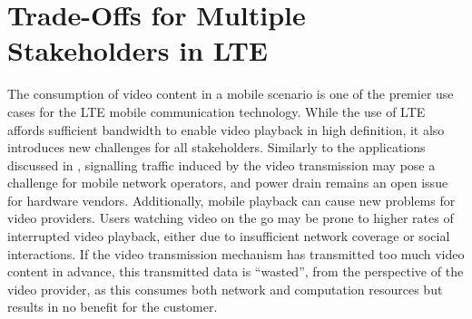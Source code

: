 \section{Trade-Offs for Multiple Stakeholders in LTE}\label{sec:application:lte_video}

\newcommand{\bandwidth}{\ensuremath{b_W}\xspace}
\newcommand{\bitrate}{\ensuremath{b_R}\xspace}
\newcommand{\timeplayedback}{\ensuremath{t_p}}

\newcommand{\streamingstart}{\ensuremath{\sigma}\xspace}
\newcommand{\bufferlower}{\ensuremath{\theta}\xspace}
\newcommand{\buffersize}{\ensuremath{\Theta}\xspace}

\newcommand{\ton}{\(T_{\texttt{ON}}\)\xspace}
\newcommand{\tdrxinactivity}{\(T_{\texttt{I}}\)\xspace}

\newcommand{\shortdrx}{\texttt{Short} \texttt{DRX}\xspace}
\newcommand{\tshortdrx}{\(T_{\texttt{S}}\)\xspace}
\newcommand{\longdrx}{\texttt{Long} \texttt{DRX}\xspace}
\newcommand{\tlongdrx}{\(T_{\texttt{L}}\)\xspace}
\newcommand{\rrcconnected}{\texttt{RRC\_Connected}\xspace}
\newcommand{\tidle}{\(T_{\texttt{Idle}}\)\xspace}
\newcommand{\tonidle}{\(T^{\texttt{Idle}}_{\texttt{ON}}\)\xspace}
\newcommand{\rrcidle}{\texttt{RRC\_Idle}\xspace}
\newcommand{\tdrxidle}{\(T^{\texttt{Idle}}_{\texttt{\gls{DRX}}}\)\xspace}
\newcommand{\promotiondelay}{\(D_P\)\xspace}

\newcommand{\bandwidthdown}{b_d\xspace}
\newcommand{\timedownloaded}{\ensuremath{t_d}}

\newcommand{\power}{P\xspace}
\newcommand{\energyconsumption}{\ensuremath{E}\xspace}
\newcommand{\connectioncount}{\ensuremath{C}\xspace}

\newcommand{\factordown}{\ensuremath{\alpha}\xspace}
\newcommand{\powerbaseline}{\ensuremath{\beta}\xspace}

\newcommand{\userabortrv}{\ensuremath{A}\xspace}
\newcommand{\userabortpdf}{\ensuremath{a}\xspace}
\newcommand{\meanwastedtraffic}{\ensuremath{W}\xspace}

\newcommand{\timeunwatched}{\ensuremath{t_u}}
\newcommand{\videolength}{l\xspace}

The consumption of video content in a mobile scenario is one of the premier use cases for the \gls{LTE} mobile communication technology.
While the use of \gls{LTE} affords sufficient bandwidth to enable video playback in high definition, it also introduces new challenges for all stakeholders.
Similarly to the applications discussed in , signalling traffic induced by the video transmission may pose a challenge for mobile network operators, and power drain remains an open issue for hardware vendors.
Additionally, mobile playback can cause new problems for video providers.
Users watching video on the go may be prone to higher rates of interrupted video playback, either due to insufficient network coverage or social interactions.
If the video transmission mechanism has transmitted too much video content in advance, this transmitted data is ``wasted'', from the perspective of the video provider, as this consumes both network and computation resources but results in no benefit for the customer.

